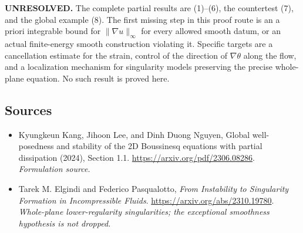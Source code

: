 \documentclass[11pt]{article}
\begin{document}
\textbf{UNRESOLVED.} The complete partial results are (1)--(6), the
countertest (7), and the global example (8). The first missing step in
this proof route is an a priori integrable bound for $\|\nabla u\|_\infty$
for every allowed smooth datum, or an actual finite-energy smooth
construction violating it. Specific targets are a cancellation estimate
for the strain, control of the direction of $\nabla\theta$ along the
flow, and a localization mechanism for singularity models preserving
the precise whole-plane equation. No such result is proved here.

\subsection{Sources}
\begin{itemize}
\item[S1]Kyungkeun Kang, Jihoon Lee, and Dinh Duong Nguyen, Global well-posedness and stability of the 2D Boussinesq equations with partial dissipation (2024), Section 1.1.
\url{https://arxiv.org/pdf/2306.08286}.
\textit{Formulation source.}
\item[E1]Tarek M. Elgindi and Federico Pasqualotto, \emph{From Instability to Singularity Formation in Incompressible Fluids}.
\url{https://arxiv.org/abs/2310.19780}.
\textit{Whole-plane lower-regularity singularities; the exceptional smoothness hypothesis is not dropped.}
\end{itemize}
\end{document}
